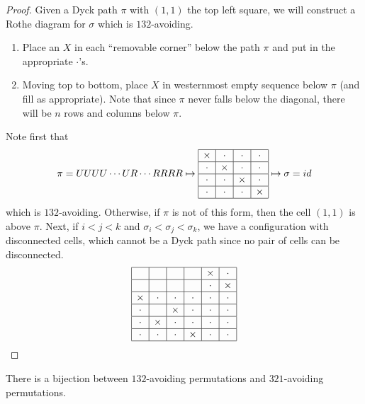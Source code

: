 \documentclass[11pt,leqno,oneside]{amsart}
\numberwithin{thm}{section}
\begin{document}
\begin{proof}
  Given a Dyck path \(\pi\) with \((1,1)\) the top left square,
  we will construct a Rothe diagram for \(\sigma\) which is
  \(132\)-avoiding.
  \begin{enumerate}
  \item Place an \(X\) in each ``removable corner'' below the path
    \(\pi\) and put in the appropriate \(\cdot\)'s.
  \item Moving top to bottom, place \(X\) in westernmost empty
    sequence below \(\pi\) (and fill as appropriate). Note that since
    \(\pi\) never falls below the diagonal, there will be \(n\) rows
    and columns below \(\pi\).
  \end{enumerate}
  Note first that
  \[
    \pi = UUUU \cdots UR \cdots RRRR \mapsto \begin{array}{|c|c|c|c|} \hline
                             \times&\cdot&\cdot&\cdot\\ 
            \hline \cdot&\times&\cdot&\cdot\\ \hline
            \cdot&\cdot&\times&\cdot\\ \hline
            \cdot&\cdot&\cdot&\times\\ \hline \end{array} \mapsto
          \sigma = id
   \]
   which is \(132\)-avoiding. Otherwise, if \(\pi\) is not of this
   form, then the cell \((1,1)\) is above \(\pi\). Next, if \(i < j <
   k\) and \(\sigma_i < \sigma_j < \sigma_k\), we have a configuration
   with disconnected cells, which cannot be a Dyck path since no pair
   of cells can be disconnected. \[
     \begin{array}{|c|c|c|c|c|c|} \hline &&&&\times&\cdot\\ \hline &&&&\cdot&\times\\ \hline \times&\cdot&\cdot&\cdot&\cdot&\cdot\\ \hline \cdot&&\times&\cdot&\cdot&\cdot\\ \hline \cdot&\times&\cdot&\cdot&\cdot&\cdot\\ \hline \cdot&\cdot&\cdot&\times&\cdot&\cdot\\ \hline \end{array}
   \]
 \end{proof}
 \begin{prop}
   There is a bijection between \(132\)-avoiding permutations and
   \(321\)-avoiding permutations.
 \end{prop}
\end{document}
